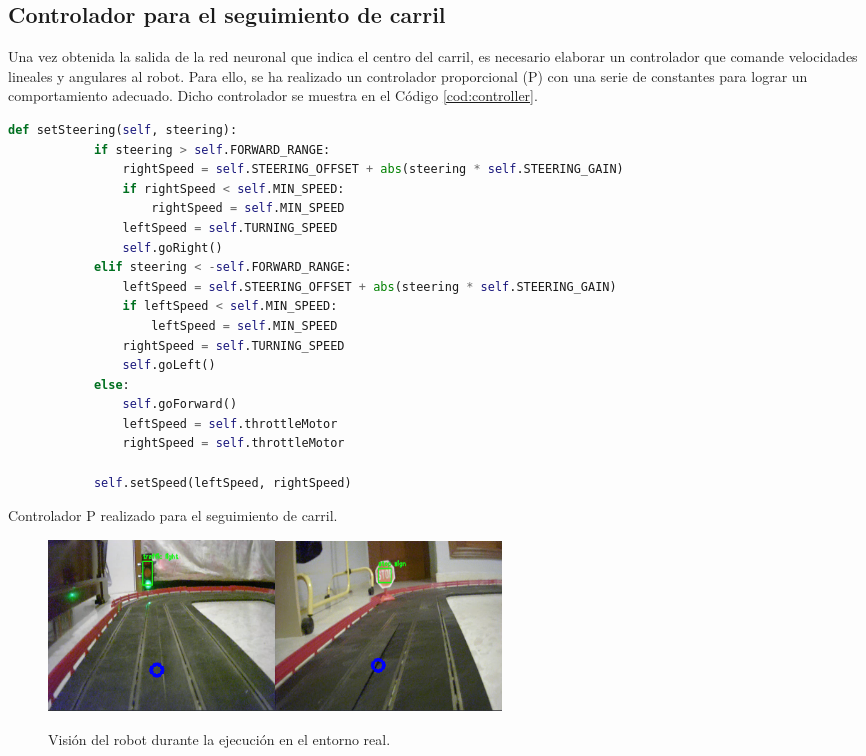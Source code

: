\subsection{Controlador para el seguimiento de carril}
Una vez obtenida la salida de la red neuronal que indica el centro del carril, es necesario elaborar un controlador que comande velocidades lineales y angulares al robot. Para ello, se ha realizado un controlador proporcional (P) con una serie de constantes para lograr un comportamiento adecuado. Dicho controlador se muestra en el Código \ref{cod:controller}.\\ 
\begin{code}[h]
	\begin{lstlisting}[language=Python]
		def setSteering(self, steering):
			if steering > self.FORWARD_RANGE:
				rightSpeed = self.STEERING_OFFSET + abs(steering * self.STEERING_GAIN)
				if rightSpeed < self.MIN_SPEED:
					rightSpeed = self.MIN_SPEED
				leftSpeed = self.TURNING_SPEED
				self.goRight()
			elif steering < -self.FORWARD_RANGE:
				leftSpeed = self.STEERING_OFFSET + abs(steering * self.STEERING_GAIN)
				if leftSpeed < self.MIN_SPEED:
					leftSpeed = self.MIN_SPEED
				rightSpeed = self.TURNING_SPEED
				self.goLeft()
			else:
				self.goForward()
				leftSpeed = self.throttleMotor
				rightSpeed = self.throttleMotor
			
			self.setSpeed(leftSpeed, rightSpeed)
	\end{lstlisting}
	\caption[Controlador P realizado para el seguimiento de carril.]{Controlador P realizado para el seguimiento de carril.}
	\label{cod:controller}
\end{code}
\begin{figure} [h!]
	\begin{center}
		\includegraphics[width=6cm]{figs/screenshottrafficlight}\hspace{0.5cm}\includegraphics[width=6cm]{figs/screenshotstopsign}
	\end{center}
	\caption{Visión del robot durante la ejecución en el entorno real.}
	\label{fig:screenshotsreal}
\end{figure}\

